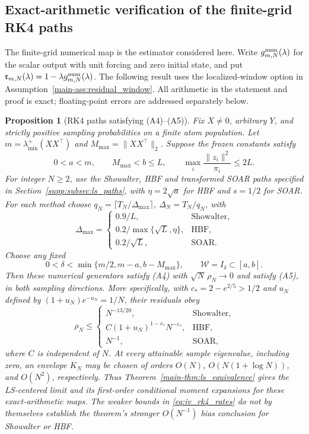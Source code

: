 \documentclass[11pt,a4paper,leqno]{article}
\numberwithin{equation}{section}
\numberwithin{figure}{section}
\numberwithin{table}{section}
\theoremstyle{plain}
\newtheorem{proposition}[lemma]{Proposition}
\theoremstyle{definition}
\theoremstyle{remark}
\begin{document}
\subsection{Exact-arithmetic verification of the finite-grid RK4 paths}
\label{supp:subsec:rk4_bridge}

The finite-grid numerical map is the estimator considered here.
Write $g_{m,N}^{\rm num}(\lambda)$ for the
scalar output with unit forcing and zero initial state, and put
$\mathfrak{r}_{m,N}(\lambda)=1-\lambda g_{m,N}^{\rm num}(\lambda)$.
The following result uses the localized-window option in
Assumption~\ref{main-ass:residual_window}. All arithmetic in the statement
and proof is exact; floating-point errors are addressed separately below.

\begin{proposition}[RK4 paths satisfying (A4)--(A5)]
\label{prop:iv_rk4_bridge}
Fix $X\ne0$, arbitrary $Y$, and strictly positive sampling probabilities on a
finite atom population. Let $m=\lambda_{\min}^+(XX^\top)$ and
$M_{\max}=\|XX^\top\|_2$. Suppose the frozen constants satisfy
\begin{equation}\label{eq:iv_rk4_spectral_setup}
 0<a<m,\qquad M_{\max}<b\le L,\qquad
 \max_i\frac{\|z_i\|^2}{\pi_i}\le 2L.
\end{equation}
For integer $N\ge2$, use the Showalter, HBF and transformed SOAR paths
specified in Section~\ref{supp:subsec:ls_paths}, with
$\eta=2\sqrt a$ for HBF and $s=1/2$ for SOAR. For each method choose
$q_N=\lceil T_N/\Delta_{\max}\rceil$, $\Delta_N=T_N/q_N$, with
\[
 \Delta_{\max}=\begin{cases}
  0.9/L,&\text{Showalter},\\
  0.2/\max\{\sqrt L,\eta\},&\text{HBF},\\
  0.2/\sqrt L,&\text{SOAR}.
 \end{cases}
\]
Choose any fixed
\[
 0<\delta<\min\{m/2,m-a,b-M_{\max}\},\qquad
 \mathcal W=I_\delta\subset[a,b].
\]
Then these numerical generators satisfy (A4) with
$\sqrt N\,\rho_N\to0$ and satisfy (A5), in both sampling directions.
More specifically, with $c_*=2-e^{2/5}>1/2$ and $u_N$ defined by
$(1+u_N)e^{-u_N}=1/N$, their residuals obey
\begin{equation}\label{eq:iv_rk4_rates}
 \rho_N\le
 \begin{cases}
 N^{-13/20},&\text{Showalter},\\
 C(1+u_N)^{1-c_*}N^{-c_*},&\text{HBF},\\
 N^{-1},&\text{SOAR},
 \end{cases}
\end{equation}
where $C$ is independent of $N$. At every attainable sample eigenvalue,
including zero, an envelope $K_N$ may be chosen of orders $O(N)$,
$O(N(1+\log N))$, and $O(N^2)$, respectively. Thus
Theorem~\ref{main-thm:ls_equivalence} gives the LS-centered limit and its
first-order conditional moment expansions for these exact-arithmetic maps.
The weaker bounds in \eqref{eq:iv_rk4_rates} do not by themselves establish
the theorem's stronger $O(N^{-1})$ bias conclusion for Showalter or HBF.
\end{proposition}
\end{document}
